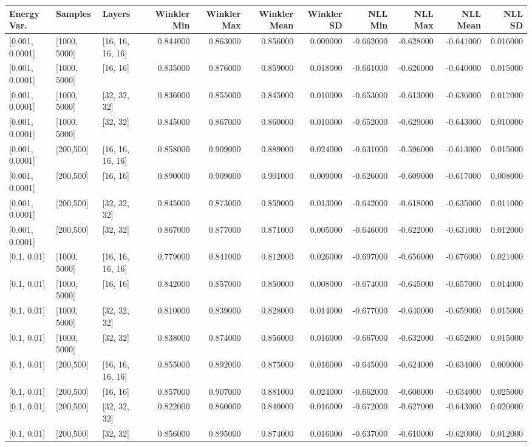 \begin{tabular}{lllrrrrrrrr}
\toprule
Energy Var. & Samples & Layers & Winkler Min & Winkler Max & Winkler Mean & Winkler SD & NLL Min & NLL Max & NLL Mean & NLL SD \\
\midrule
{[0.001, 0.0001]} & [1000, 5000] & [16, 16, 16, 16] & 0.844000 & 0.863000 & 0.856000 & 0.009000 & -0.662000 & -0.628000 & -0.641000 & 0.016000 \\
{[0.001, 0.0001]} & [1000, 5000] & [16, 16] & 0.835000 & 0.876000 & 0.859000 & 0.018000 & -0.661000 & -0.626000 & -0.640000 & 0.015000 \\
{[0.001, 0.0001]} & [1000, 5000] & [32, 32, 32] & 0.836000 & 0.855000 & 0.845000 & 0.010000 & -0.653000 & -0.613000 & -0.636000 & 0.017000 \\
{[0.001, 0.0001]} & [1000, 5000] & [32, 32] & 0.845000 & 0.867000 & 0.860000 & 0.010000 & -0.652000 & -0.629000 & -0.643000 & 0.010000 \\
{[0.001, 0.0001]} & [200,500] & [16, 16, 16, 16] & 0.858000 & 0.909000 & 0.889000 & 0.024000 & -0.631000 & -0.596000 & -0.613000 & 0.015000 \\
{[0.001, 0.0001]} & [200,500] & [16, 16] & 0.890000 & 0.909000 & 0.901000 & 0.009000 & -0.626000 & -0.609000 & -0.617000 & 0.008000 \\
{[0.001, 0.0001]} & [200,500] & [32, 32, 32] & 0.845000 & 0.873000 & 0.859000 & 0.013000 & -0.642000 & -0.618000 & -0.635000 & 0.011000 \\
{[0.001, 0.0001]} & [200,500] & [32, 32] & 0.867000 & 0.877000 & 0.871000 & 0.005000 & -0.646000 & -0.622000 & -0.631000 & 0.012000 \\
{[0.1, 0.01]} & [1000, 5000] & [16, 16, 16, 16] & 0.779000 & 0.841000 & 0.812000 & 0.026000 & -0.697000 & -0.656000 & -0.676000 & 0.021000 \\
{[0.1, 0.01]} & [1000, 5000] & [16, 16] & 0.842000 & 0.857000 & 0.850000 & 0.008000 & -0.674000 & -0.645000 & -0.657000 & 0.014000 \\
{[0.1, 0.01]} & [1000, 5000] & [32, 32, 32] & 0.810000 & 0.839000 & 0.828000 & 0.014000 & -0.677000 & -0.640000 & -0.659000 & 0.015000 \\
{[0.1, 0.01]} & [1000, 5000] & [32, 32] & 0.838000 & 0.874000 & 0.856000 & 0.016000 & -0.667000 & -0.632000 & -0.652000 & 0.015000 \\
{[0.1, 0.01]} & [200,500] & [16, 16, 16, 16] & 0.855000 & 0.892000 & 0.875000 & 0.016000 & -0.645000 & -0.624000 & -0.634000 & 0.009000 \\
{[0.1, 0.01]} & [200,500] & [16, 16] & 0.857000 & 0.907000 & 0.881000 & 0.024000 & -0.662000 & -0.606000 & -0.634000 & 0.025000 \\
{[0.1, 0.01]} & [200,500] & [32, 32, 32] & 0.822000 & 0.860000 & 0.840000 & 0.016000 & -0.672000 & -0.627000 & -0.643000 & 0.020000 \\
{[0.1, 0.01]} & [200,500] & [32, 32] & 0.856000 & 0.895000 & 0.874000 & 0.016000 & -0.637000 & -0.610000 & -0.620000 & 0.012000 \\
\bottomrule
\end{tabular}

